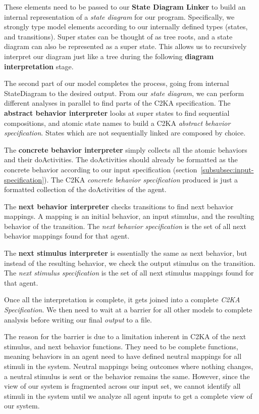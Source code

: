     These elements need to be passed to our \textbf{State Diagram Linker}
    to build an internal representation of a \textit{state diagram} for our program.
    Specifically, we strongly type model elements according to our internally defined types (states, and transitions).
    Super states can be thought of as tree roots, and a state diagram can also be represented as a super state.
    This allows us to recursively interpret our diagram just like a tree during the following \textbf{diagram interpretation} stage.

    The second part of our model completes the process, going from internal StateDiagram to the desired output.
    From our \textit{state diagram}, we can perform different analyses in parallel to find parts of the C2KA specification.
    The \textbf{abstract behavior interpreter} looks at super states to find sequential compositions,
    and atomic state names to build a C2KA \textit{abstract behavior specification}.
    States which are not sequentially linked are composed by choice.

    The \textbf{concrete behavior interpreter} simply collects all the atomic behaviors and their doActivities.
    The doActivities should already be formatted as the concrete behavior according to our input specification (section~\ref{subsubsec:input-specification}).
    The C2KA \textit{concrete behavior specification} produced is just a formatted collection of the doActivities of the agent.

    The \textbf{next behavior interpreter} checks transitions to find next behavior mappings.
    A mapping is an initial behavior, an input stimulus, and the resulting behavior of the transition.
    The \textit{next behavior specification} is the set of all next behavior mappings found for that agent.

    The \textbf{next stimulus interpreter} is essentially the same as next behavior,
    but instead of the resulting behavior, we check the output stimulus on the transition.
    The \textit{next stimulus specification} is the set of all next stimulus mappings found for that agent.

    Once all the interpretation is complete, it gets joined into a complete \textit{C2KA Specification}.
    We then need to wait at a barrier for all other models to complete analysis before writing our final \textit{output} to a file.

    The reason for the barrier is due to a limitation inherent in C2KA of the next stimulus, and next behavior functions.
    They need to be complete functions,
    meaning behaviors in an agent need to have defined neutral mappings for all stimuli in the system.
    Neutral mappings being outcomes where nothing changes, a neutral stimulus is sent or the behavior remains the same.
    However, since the view of our system is fragmented across our input set,
    we cannot identify all stimuli in the system until we analyze all agent inputs to get a complete view of our system.



